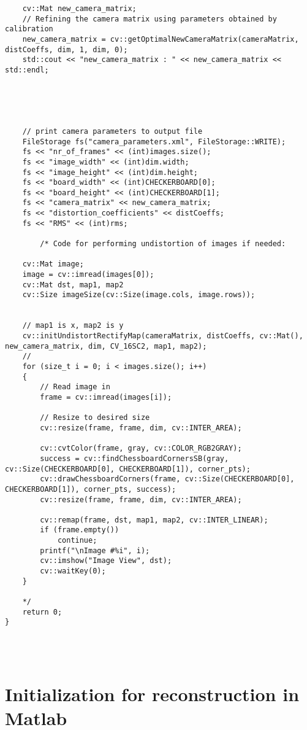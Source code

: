 \begin{appendices}
\begin{verbatim}
	cv::Mat new_camera_matrix;
	// Refining the camera matrix using parameters obtained by calibration
	new_camera_matrix = cv::getOptimalNewCameraMatrix(cameraMatrix, distCoeffs, dim, 1, dim, 0);
	std::cout << "new_camera_matrix : " << new_camera_matrix << std::endl;





	// print camera parameters to output file
	FileStorage fs("camera_parameters.xml", FileStorage::WRITE);
	fs << "nr_of_frames" << (int)images.size();
	fs << "image_width" << (int)dim.width;
	fs << "image_height" << (int)dim.height;
	fs << "board_width" << (int)CHECKERBOARD[0];
	fs << "board_height" << (int)CHECKERBOARD[1];
	fs << "camera_matrix" << new_camera_matrix;
	fs << "distortion_coefficients" << distCoeffs;
	fs << "RMS" << (int)rms;

		/* Code for performing undistortion of images if needed: 

	cv::Mat image;
	image = cv::imread(images[0]);
	cv::Mat dst, map1, map2
	cv::Size imageSize(cv::Size(image.cols, image.rows));


	// map1 is x, map2 is y
	cv::initUndistortRectifyMap(cameraMatrix, distCoeffs, cv::Mat(), new_camera_matrix, dim, CV_16SC2, map1, map2);
	//
	for (size_t i = 0; i < images.size(); i++)
	{
		// Read image in
		frame = cv::imread(images[i]);

		// Resize to desired size
		cv::resize(frame, frame, dim, cv::INTER_AREA);

		cv::cvtColor(frame, gray, cv::COLOR_RGB2GRAY);
		success = cv::findChessboardCornersSB(gray, cv::Size(CHECKERBOARD[0], CHECKERBOARD[1]), corner_pts);
		cv::drawChessboardCorners(frame, cv::Size(CHECKERBOARD[0], CHECKERBOARD[1]), corner_pts, success);
		cv::resize(frame, frame, dim, cv::INTER_AREA);
	
		cv::remap(frame, dst, map1, map2, cv::INTER_LINEAR);
		if (frame.empty())
			continue;
		printf("\nImage #%i", i);
		cv::imshow("Image View", dst);
		cv::waitKey(0);
	}
	
	*/
	return 0;
}

	
	
\end{verbatim}



\section{Initialization for reconstruction in Matlab}
\begin{verbatim}



\end{verbatim}
\end{appendices}
